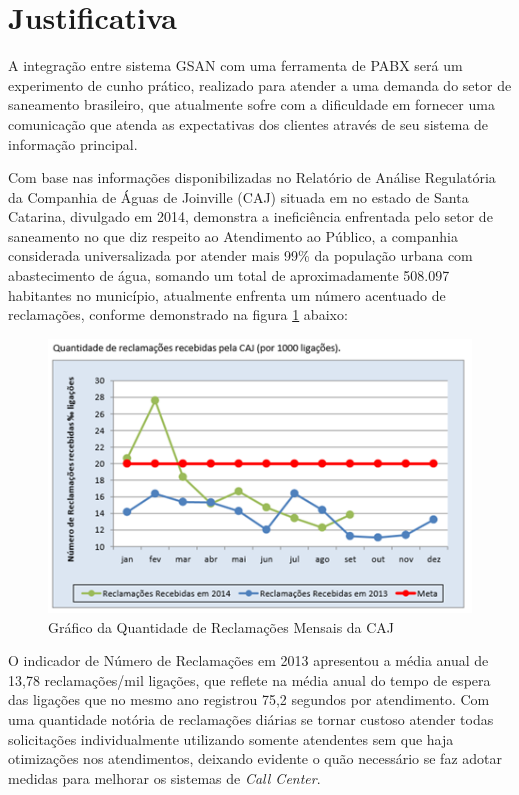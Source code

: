 \section*{Justificativa}
A integração entre sistema GSAN com uma ferramenta de PABX será um experimento de cunho prático, realizado para atender a uma demanda do setor de saneamento brasileiro, que atualmente sofre com a dificuldade em fornecer uma comunicação que atenda as expectativas dos clientes através de seu sistema de informação principal.

Com base nas informações disponibilizadas no Relatório de Análise Regulatória da Companhia de Águas de Joinville (CAJ) \cite{AMAE2014} 
situada em no estado de Santa Catarina, divulgado em 2014, demonstra a ineficiência enfrentada pelo setor de saneamento no que diz respeito ao Atendimento ao Público, a companhia considerada universalizada por atender mais 99\% da população urbana com abastecimento de água, somando um total de aproximadamente 508.097 habitantes no município, atualmente enfrenta um número acentuado de reclamações, conforme demonstrado na figura \ref{figura:ligacoesReclamacoes} abaixo:
 

\begin{figure}[H]
	\centering
	\caption{Gráfico da Quantidade de Reclamações Mensais da CAJ} 
	\label{figura:ligacoesReclamacoes}	
	\includegraphics{figuras/LigacoesReclamacoes.png}
\end{figure}


 O indicador de Número de Reclamações em 2013 apresentou a média anual de 13,78 reclamações/mil ligações, que reflete na média anual do tempo de espera das ligações que no mesmo ano registrou 75,2 segundos por atendimento. Com uma quantidade notória de reclamações diárias se tornar custoso atender todas solicitações individualmente utilizando somente atendentes sem que haja otimizações nos atendimentos,   deixando evidente o quão necessário se faz adotar medidas para melhorar os sistemas de \textit{Call Center}. 
 
